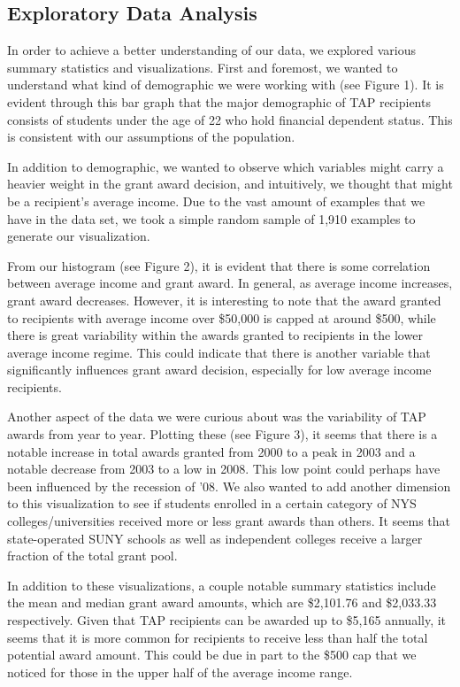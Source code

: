 \documentclass[12pt, fleqn]{article}
\begin{document}
\subsection{Exploratory Data Analysis}
In order to achieve a better understanding of our data, we explored various summary statistics and visualizations. First and foremost, we wanted to understand what kind of demographic we were working with (see Figure 1). It is evident through this bar graph that the major demographic of TAP recipients consists of students under the age of 22 who hold financial dependent status. This is consistent with our assumptions of the population.

In addition to demographic, we wanted to observe which variables might carry a heavier weight in the grant award decision, and intuitively, we thought that might be a recipient's average income. Due to the vast amount of examples that we have in the data set, we took a simple random sample of 1,910 examples to generate our visualization.

From our histogram (see Figure 2), it is evident that there is some correlation between average income and grant award. In general, as average income increases, grant award decreases. However, it is interesting to note that the award granted to recipients with average income over \$50,000 is capped at around \$500, while there is great variability within the awards granted to recipients in the lower average income regime. This could indicate that there is another variable that significantly influences grant award decision, especially for low average income recipients.

Another aspect of the data we were curious about was the variability of TAP awards from year to year. Plotting these (see Figure 3), it seems that there is a notable increase in total awards granted from 2000 to a peak in 2003 and a notable decrease from 2003 to a low in 2008. This low point could perhaps have been influenced by the recession of '08. We also wanted to add another dimension to this visualization to see if students enrolled in a certain category of NYS colleges/universities received more or less grant awards than others. It seems that state-operated SUNY schools as well as independent colleges receive a larger fraction of the total grant pool. 

In addition to these visualizations, a couple notable summary statistics include the mean and median grant award amounts, which are \$2,101.76 and \$2,033.33 respectively. Given that TAP recipients can be awarded up to \$5,165 annually, it seems that it is more common for recipients to receive less than half the total potential award amount. This could be due in part to the \$500 cap that we noticed for those in the upper half of the average income range.
\end{document}
